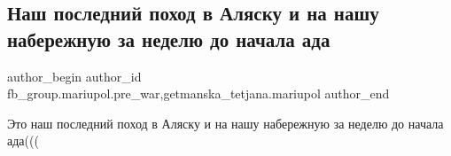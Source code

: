  
 
 
 
 

\subsection{Наш последний поход в Аляску и на нашу набережную за неделю до начала ада}
\label{sec:13_02_2023.fb.fb_group.mariupol.pre_war.9.nash_poslednii_pokho}
 
\ifcmt
 author_begin
   author_id fb_group.mariupol.pre_war,getmanska_tetjana.mariupol
 author_end
\fi

Это наш последний поход в Аляску и на нашу набережную за неделю до начала ада(((

